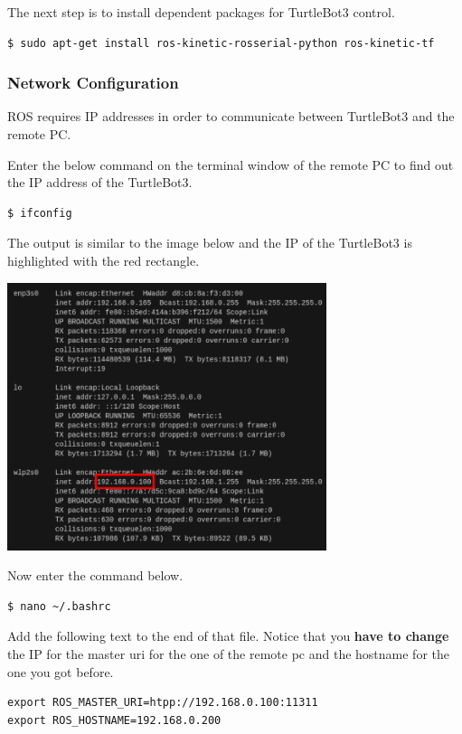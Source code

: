 \documentclass{article}
\begin{document}
The next step is to install dependent packages for TurtleBot3 control.

\begin{verbatim}
$ sudo apt-get install ros-kinetic-rosserial-python ros-kinetic-tf
\end{verbatim}

\subsubsection{Network Configuration}

ROS requires IP addresses in order to communicate between TurtleBot3 and the remote PC.

Enter the below command on the terminal window of the remote PC to find out the IP address of the TurtleBot3.

\begin{verbatim}
$ ifconfig
\end{verbatim}

The output is similar to the image below and the IP of the TurtleBot3 is highlighted with the red rectangle.

\bigskip

\includegraphics[width=0.7\textwidth]{network_configuration2}

\newpage

Now enter the command below.

\begin{verbatim}
$ nano ~/.bashrc
\end{verbatim}

Add the following text to the end of that file. Notice that you \textbf{have to change} the IP for the master uri for the one of the remote pc and the hostname for the one you got before.

\begin{verbatim}
export ROS_MASTER_URI=htpp://192.168.0.100:11311
export ROS_HOSTNAME=192.168.0.200
\end{verbatim}
\end{document}

